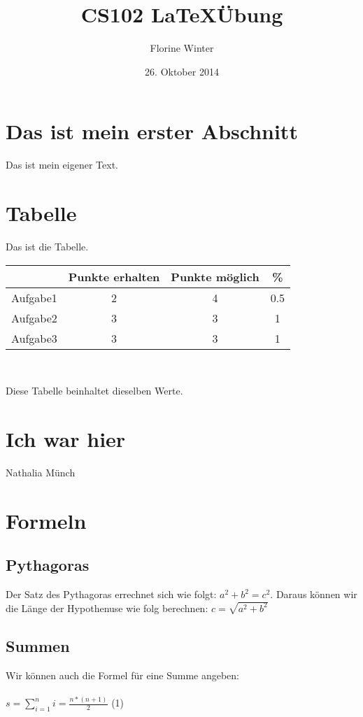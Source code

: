 \documentclass{article}
\author{Florine Winter}
\title{CS102 \LaTeX \"Ubung}
\date{26. Oktober 2014}
\begin{document}
\maketitle
\section{Das ist mein erster Abschnitt}
Das ist mein eigener Text.
\section{Tabelle}
Das ist die Tabelle.\\

\begin{tabular}{c|c|c|c}

 & Punkte erhalten & Punkte m\"oglich & \% \\
\hline
Aufgabe1 & 2 & 4 & 0.5 \\
Aufgabe2 & 3 & 3 & 1 \\
Aufgabe3 & 3 & 3 & 1 \\

\end{tabular}\\
\begin{center}
Diese Tabelle beinhaltet dieselben Werte.
\end{center}
\section{Ich war hier}
Nathalia M\"unch
\section{Formeln}
\subsection{Pythagoras}
Der Satz des Pythagoras errechnet sich wie folgt:
$a^2 + b^2 = c^2$. Daraus k\"onnen wir die L\"ange der Hypothenuse wie folg berechnen: $c= \sqrt{a^2 + b^2}$
\subsection{Summen}
Wir k\"onnen auch die Formel f\"ur eine Summe angeben:\\
\\
\centering
$s= \sum\limits_{i=1}^{n}i=\frac{n*(n+1)}{2}$ (1)
\end{document}
